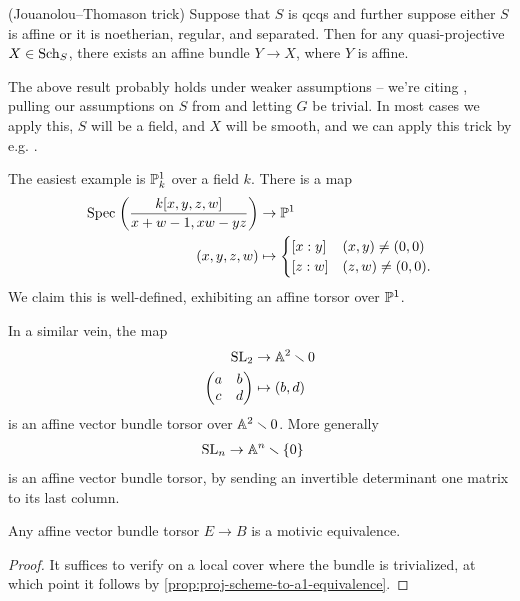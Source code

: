 \documentclass[11pt,openany]{book}
\begin{document}
\begin{theorem} (Jouanolou--Thomason trick) Suppose that $S$ is qcqs and further suppose either $S$ is affine or it is noetherian, regular, and separated. Then for any quasi-projective $X\in \Sch_S$, there exists an affine bundle $Y \to X$, where $Y$ is affine.
\end{theorem}

\begin{remark} The above result probably holds under weaker assumptions -- we're citing \cite[2.20]{Hoyois6}, pulling our assumptions on $S$ from \cite[2.8]{Hoyois6} and letting $G$ be trivial. In most cases we apply this, $S$ will be a field, and $X$ will be smooth, and we can apply this trick by e.g. \cite[3.3.3]{AF-spheres}.
\end{remark}


\begin{example} The easiest example is $\P^1_k$ over a field $k$. There is a map
\begin{align*}
    \Spec \left( \frac{k[x,y,z,w]}{x+w-1,xw-yz} \right) &\to \P^1 \\
    (x,y,z,w) &\mapsto \begin{cases} [x:y] & (x,y)\ne (0,0) \\ [z:w] & (z,w)\ne (0,0). \end{cases}
\end{align*}
We claim this is well-defined, exhibiting an affine torsor over $\P^1$.
\end{example}

\begin{example} In a similar vein, the map
\begin{align*}
    \SL_2 &\to \A^2\minus 0 \\
    \begin{pmatrix} a & b \\ c & d \end{pmatrix} &\mapsto (b,d)
\end{align*}
is an affine vector bundle torsor over $\A^2\minus 0$. More generally
\begin{align*}
    \SL_n &\to \A^n\minus\{0\}
\end{align*}
is an affine vector bundle torsor, by sending an invertible determinant one matrix to its last column.
\end{example}

\begin{proposition} Any affine vector bundle torsor $E \to B$ is a motivic equivalence.
\end{proposition}
\begin{proof} It suffices to verify on a local cover where the bundle is trivialized, at which point it follows by \autoref{prop:proj-scheme-to-a1-equivalence}.
\end{proof}
\end{document}
